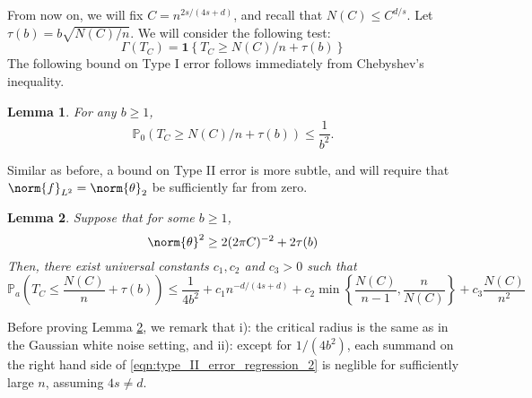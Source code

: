 \documentclass{article}
\newcommand{\set}[1]{\left\{#1\right\}}
\newcommand{\1}{\mathbb{I}}
\newcommand{\Pbb}{\mathbb{P}}
\theoremstyle{alden}
\theoremstyle{aldenthm}
\newtheorem{lemma}{Lemma}
\theoremstyle{definition}
\theoremstyle{remark}
\begin{document}
From now on, we will fix $C = n^{2s/(4s + d)}$, and recall that $N(C) \leq C^{d/s}$. Let $\tau(b) = b \sqrt{N(C)/n}$. We will consider the following test:
\begin{equation*}
\Gamma(T_C) = \mathbf{1}\set{T_C \geq N(C)/n + \tau(b)}
\end{equation*}
The following bound on Type I error follows immediately from Chebyshev's inequality.
\begin{lemma}
	For any $b \geq 1$,
	\begin{equation*}
	\Pbb_0(T_C \geq N(C)/n + \tau(b)) \leq \frac{1}{b^2}.
	\end{equation*}
\end{lemma}
Similar as before, a bound on Type II error is more subtle, and will require that $\norm{f}_{L^2} = \norm{\theta}_2$ be sufficiently far from zero.
\begin{lemma}
	\label{lem:type_II_error_regression}
	Suppose that for some $b \geq 1$, 
	\begin{equation}
	\label{eqn:type_II_error_regression_1}
	\norm{\theta}^2 \geq 2(2\pi C)^{-2} + 2\tau(b)
	\end{equation}
	Then, there exist universal constants $c_1, c_2$ and $c_3 > 0$ such that
	\begin{equation}
	\label{eqn:type_II_error_regression_2}
	\Pbb_a\left(T_C \leq \frac{N(C)}{n} + \tau(b) \right) \leq \frac{1}{4b^2} +  c_1 n^{-d/(4s + d)} + c_2 \min\set{\frac{N(C)}{n - 1},\frac{n}{N(C)}} + c_3 \frac{N(C)}{n^2}
	\end{equation}
\end{lemma}
Before proving Lemma \ref{lem:type_II_error_regression}, we remark that i): the critical radius is the same as in the Gaussian white noise setting, and ii): except for $1/(4b^2)$, each summand on the right hand side of \eqref{eqn:type_II_error_regression_2} is neglible for sufficiently large $n$, assuming $4s \neq d$. 
\end{document}
